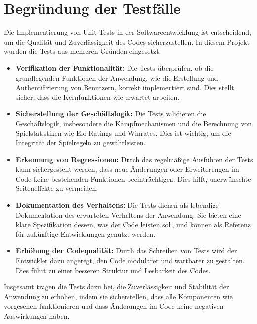 \documentclass{article}
\begin{document}
\section{Begründung der Testfälle}

Die Implementierung von Unit-Tests in der Softwareentwicklung ist entscheidend, um die Qualität und Zuverlässigkeit des Codes sicherzustellen. In diesem Projekt wurden die Tests aus mehreren Gründen eingesetzt:

\begin{itemize}
    \item \textbf{Verifikation der Funktionalität:} Die Tests überprüfen, ob die grundlegenden Funktionen der Anwendung, wie die Erstellung und Authentifizierung von Benutzern, korrekt implementiert sind. Dies stellt sicher, dass die Kernfunktionen wie erwartet arbeiten.

    \item \textbf{Sicherstellung der Geschäftslogik:} Die Tests validieren die Geschäftslogik, insbesondere die Kampfmechanismen und die Berechnung von Spielstatistiken wie Elo-Ratings und Winrates. Dies ist wichtig, um die Integrität der Spielregeln zu gewährleisten.

    \item \textbf{Erkennung von Regressionen:} Durch das regelmäßige Ausführen der Tests kann sichergestellt werden, dass neue Änderungen oder Erweiterungen im Code keine bestehenden Funktionen beeinträchtigen. Dies hilft, unerwünschte Seiteneffekte zu vermeiden.

    \item \textbf{Dokumentation des Verhaltens:} Die Tests dienen als lebendige Dokumentation des erwarteten Verhaltens der Anwendung. Sie bieten eine klare Spezifikation dessen, was der Code leisten soll, und können als Referenz für zukünftige Entwicklungen genutzt werden.

    \item \textbf{Erhöhung der Codequalität:} Durch das Schreiben von Tests wird der Entwickler dazu angeregt, den Code modularer und wartbarer zu gestalten. Dies führt zu einer besseren Struktur und Lesbarkeit des Codes.

\end{itemize}

Insgesamt tragen die Tests dazu bei, die Zuverlässigkeit und Stabilität der Anwendung zu erhöhen, indem sie sicherstellen, dass alle Komponenten wie vorgesehen funktionieren und dass Änderungen im Code keine negativen Auswirkungen haben.
\end{document}
